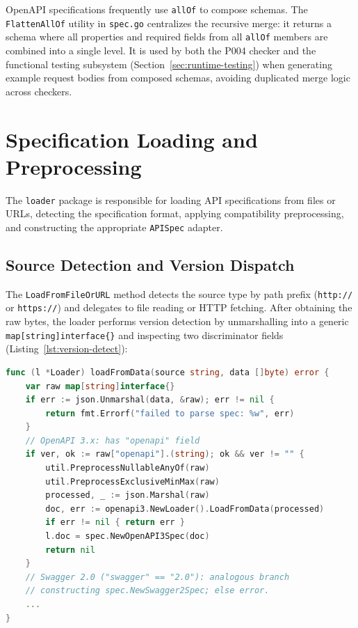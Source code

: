 OpenAPI specifications frequently use \texttt{allOf} to compose schemas. The \texttt{FlattenAllOf} utility in \texttt{spec.go} centralizes the recursive merge: it returns a schema where all properties and required fields from all \texttt{allOf} members are combined into a single level. It is used by both the P004 checker and the functional testing subsystem (Section~\ref{sec:runtime-testing}) when generating example request bodies from composed schemas, avoiding duplicated merge logic across checkers.

\section{Specification Loading and Preprocessing}
\label{sec:loading}

The \texttt{loader} package is responsible for loading API specifications from files or URLs, detecting the specification format, applying compatibility preprocessing, and constructing the appropriate \texttt{APISpec} adapter.

\subsection{Source Detection and Version Dispatch}
\label{subsec:version-dispatch}

The \texttt{LoadFromFileOrURL} method detects the source type by path prefix (\texttt{http://} or \texttt{https://}) and delegates to file reading or HTTP fetching. After obtaining the raw bytes, the loader performs version detection by unmarshalling into a generic \texttt{map[string]interface\{\}} and inspecting two discriminator fields (Listing~\ref{lst:version-detect}):

\begin{lstlisting}[language=Go,float=htbp,caption={Specification version detection (\texttt{loader/loader.go}).},label={lst:version-detect}]
func (l *Loader) loadFromData(source string, data []byte) error {
    var raw map[string]interface{}
    if err := json.Unmarshal(data, &raw); err != nil {
        return fmt.Errorf("failed to parse spec: %w", err)
    }
    // OpenAPI 3.x: has "openapi" field
    if ver, ok := raw["openapi"].(string); ok && ver != "" {
        util.PreprocessNullableAnyOf(raw)
        util.PreprocessExclusiveMinMax(raw)
        processed, _ := json.Marshal(raw)
        doc, err := openapi3.NewLoader().LoadFromData(processed)
        if err != nil { return err }
        l.doc = spec.NewOpenAPI3Spec(doc)
        return nil
    }
    // Swagger 2.0 ("swagger" == "2.0"): analogous branch
    // constructing spec.NewSwagger2Spec; else error.
    ...
}
\end{lstlisting}

